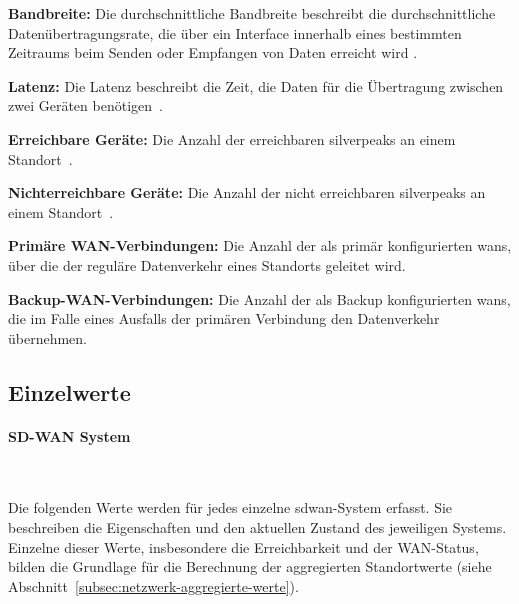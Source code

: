 \begin{compactitem}
    \item \textbf{Bandbreite:} Die durchschnittliche Bandbreite beschreibt die
    durchschnittliche Datenübertragungsrate, die über ein Interface innerhalb
    eines bestimmten Zeitraums beim Senden oder Empfangen von Daten erreicht
    wird \cite{aruba2026userguide}.

    \item \textbf{Latenz:} Die Latenz beschreibt die Zeit, die Daten für
    die Übertragung zwischen zwei Geräten benötigen~\cite{aruba2026userguide}.

    \item \textbf{Erreichbare Geräte:} Die Anzahl der erreichbaren
    \glspl{silverpeak} an einem Standort~\cite{aruba2026userguide}.

    \item \textbf{Nichterreichbare Geräte:} Die Anzahl der nicht erreichbaren
    \glspl{silverpeak} an einem Standort~\cite{aruba2026userguide}.

    \item \textbf{Primäre WAN-Verbindungen:} Die Anzahl der als primär
    konfigurierten \glspl{wan}, über die der reguläre Datenverkehr eines
    Standorts geleitet wird.

    \item \textbf{Backup-WAN-Verbindungen:} Die Anzahl der als Backup
    konfigurierten \glspl{wan}, die im Falle eines Ausfalls der primären
    Verbindung den Datenverkehr übernehmen.
\end{compactitem}

\subsection{Einzelwerte}
\label{subsec:netzwerk-einzelwerte}

\paragraph{SD-WAN System}
\label{par:sd-wan-values}

~

Die folgenden Werte werden für jedes einzelne \gls{sdwan}-System erfasst.
Sie beschreiben die Eigenschaften und den aktuellen Zustand des jeweiligen
Systems. Einzelne dieser Werte, insbesondere die Erreichbarkeit und der
WAN-Status, bilden die Grundlage für die Berechnung der aggregierten
Standortwerte (siehe Abschnitt~\ref{subsec:netzwerk-aggregierte-werte}).

